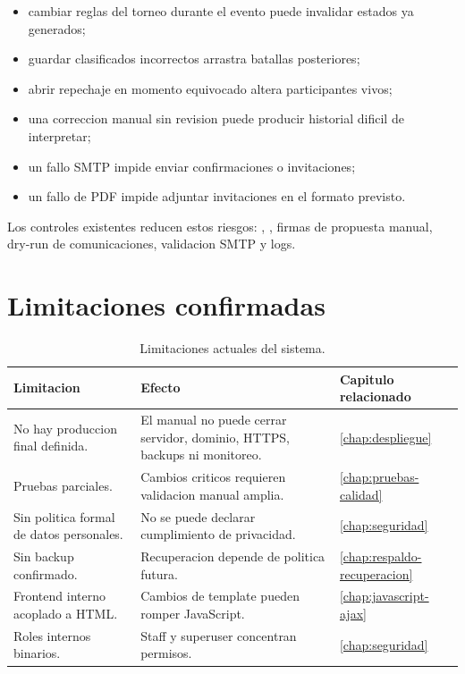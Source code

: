 \begin{itemize}
  \item cambiar reglas del torneo durante el evento puede invalidar estados ya generados;
  \item guardar clasificados incorrectos arrastra batallas posteriores;
  \item abrir repechaje en momento equivocado altera participantes vivos;
  \item una correccion manual sin revision puede producir historial dificil de interpretar;
  \item un fallo SMTP impide enviar confirmaciones o invitaciones;
  \item un fallo de PDF impide adjuntar invitaciones en el formato previsto.
\end{itemize}

Los controles existentes reducen estos riesgos: , , firmas de propuesta manual, dry-run de comunicaciones, validacion SMTP y logs.

\section{Limitaciones confirmadas}
\label{sec:riesgos-limitaciones-confirmadas}

\begin{longtable}{p{4.3cm}p{4.2cm}p{4.2cm}}
\caption{Limitaciones actuales del sistema.}
\label{tab:riesgos-limitaciones}\\
\toprule
Limitacion & Efecto & Capitulo relacionado \\
\midrule
No hay produccion final definida. & El manual no puede cerrar servidor, dominio, HTTPS, backups ni monitoreo. & \cref{chap:despliegue} \\
Pruebas parciales. & Cambios criticos requieren validacion manual amplia. & \cref{chap:pruebas-calidad} \\
Sin politica formal de datos personales. & No se puede declarar cumplimiento de privacidad. & \cref{chap:seguridad} \\
Sin backup confirmado. & Recuperacion depende de politica futura. & \cref{chap:respaldo-recuperacion} \\
Frontend interno acoplado a HTML. & Cambios de template pueden romper JavaScript. & \cref{chap:javascript-ajax} \\
Roles internos binarios. & Staff y superuser concentran permisos. & \cref{chap:seguridad} \\
\bottomrule
\end{longtable}

